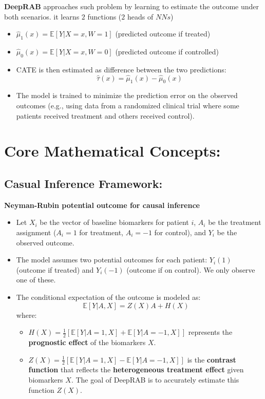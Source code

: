 \documentclass[../main.tex]{subfiles}
\begin{document}
\textbf{DeepRAB} approaches such problem by learning to estimate the outcome under both scenarios. it learns $2$ functions ($2$ heads of $NNs$)

\begin{itemize}
    \item $\hat{\mu}_1(x) = \mathbb{E}[Y|X=x, W=1]$ (predicted outcome if treated)
    \item $\hat{\mu}_0(x) = \mathbb{E}[Y|X=x, W=0]$ (predicted outcome if controlled)
    \item CATE is then estimated as difference between the two predictions:
    \[
    \hat{\tau}(x) = \hat{\mu}_1(x) - \hat{\mu}_0(x)
    \]
    \item The model is trained to minimize the prediction error on the observed outcomes (e.g., using data from a randomized clinical trial where some patients received treatment and others received control).
\end{itemize}
\section{Core Mathematical Concepts:}
\subsection*{Casual Inference Framework:}

\textbf{Neyman-Rubin potential outcome for causal inference}
\begin{itemize}
    \item Let $X_i$ be the vector of baseline biomarkers for patient $i$, $A_i$ be the treatment assignment ($A_i = 1$ for treatment, $A_i = -1$ for control), and $Y_i$ be the observed outcome.
    \item The model assumes two potential outcomes for each patient: $Y_i(1)$ (outcome if treated) and $Y_i(-1)$ (outcome if on control). We only observe one of these.
    \item The conditional expectation of the outcome is modeled as:
    \[
    \mathbb{E}[Y|A,X] = Z(X)A + H(X) \quad
    \]
    where:
    \begin{itemize}
        \item $H(X) = \frac{1}{2}[\mathbb{E}[Y|A=1, X] + \mathbb{E}[Y|A=-1, X]]$ represents the \textbf{prognostic effect} of the biomarkers $X$.
        \item $Z(X) = \frac{1}{2}[\mathbb{E}[Y|A=1, X] - \mathbb{E}[Y|A=-1, X]]$ is the \textbf{contrast function} that reflects the \textbf{heterogeneous treatment effect} given biomarkers $X$. The goal of DeepRAB is to accurately estimate this function $Z(X)$.
    \end{itemize}
\end{itemize}
\end{document}
